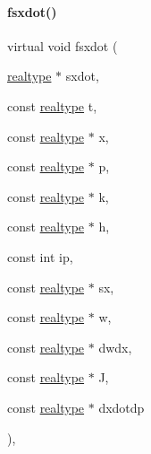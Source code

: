 \paragraph{\texorpdfstring{fsxdot()}{fsxdot()}\hspace{0.1cm}{\footnotesize\ttfamily [3/3]}}
{\footnotesize\ttfamily virtual void fsxdot (\begin{DoxyParamCaption}\item[{\mbox{\hyperlink{namespaceamici_a1bdce28051d6a53868f7ccbf5f2c14a3}{realtype}} $\ast$}]{sxdot,  }\item[{const \mbox{\hyperlink{namespaceamici_a1bdce28051d6a53868f7ccbf5f2c14a3}{realtype}}}]{t,  }\item[{const \mbox{\hyperlink{namespaceamici_a1bdce28051d6a53868f7ccbf5f2c14a3}{realtype}} $\ast$}]{x,  }\item[{const \mbox{\hyperlink{namespaceamici_a1bdce28051d6a53868f7ccbf5f2c14a3}{realtype}} $\ast$}]{p,  }\item[{const \mbox{\hyperlink{namespaceamici_a1bdce28051d6a53868f7ccbf5f2c14a3}{realtype}} $\ast$}]{k,  }\item[{const \mbox{\hyperlink{namespaceamici_a1bdce28051d6a53868f7ccbf5f2c14a3}{realtype}} $\ast$}]{h,  }\item[{const int}]{ip,  }\item[{const \mbox{\hyperlink{namespaceamici_a1bdce28051d6a53868f7ccbf5f2c14a3}{realtype}} $\ast$}]{sx,  }\item[{const \mbox{\hyperlink{namespaceamici_a1bdce28051d6a53868f7ccbf5f2c14a3}{realtype}} $\ast$}]{w,  }\item[{const \mbox{\hyperlink{namespaceamici_a1bdce28051d6a53868f7ccbf5f2c14a3}{realtype}} $\ast$}]{dwdx,  }\item[{const \mbox{\hyperlink{namespaceamici_a1bdce28051d6a53868f7ccbf5f2c14a3}{realtype}} $\ast$}]{J,  }\item[{const \mbox{\hyperlink{namespaceamici_a1bdce28051d6a53868f7ccbf5f2c14a3}{realtype}} $\ast$}]{dxdotdp }\end{DoxyParamCaption})\hspace{0.3cm}{\ttfamily [protected]}, {\ttfamily [virtual]}}

